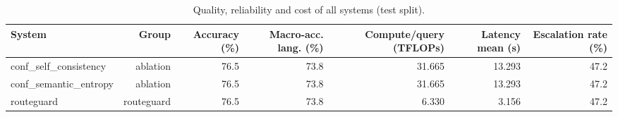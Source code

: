 \begin{table}[t]
\centering
\small
\caption{Quality, reliability and cost of all systems (test split).}
\label{tab:main_results}
\begin{tabular}{lrrrrrr}
\toprule
System & Group & Accuracy (\%) & Macro-acc. lang. (\%) & Compute/query (TFLOPs) & Latency mean (s) & Escalation rate (\%) \\
\midrule
conf\_self\_consistency & ablation & 76.5 & 73.8 & 31.665 & 13.293 & 47.2 \\
conf\_semantic\_entropy & ablation & 76.5 & 73.8 & 31.665 & 13.293 & 47.2 \\
routeguard & routeguard & 76.5 & 73.8 & 6.330 & 3.156 & 47.2 \\
\bottomrule
\end{tabular}
\end{table}
